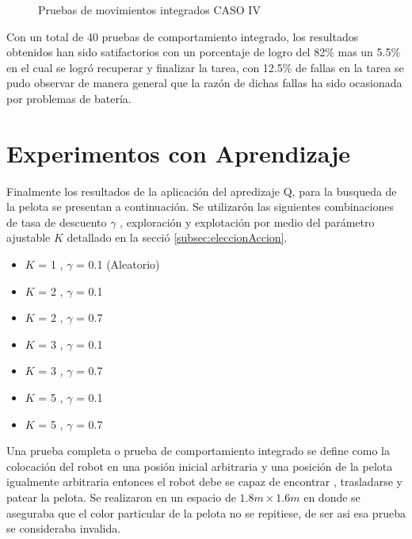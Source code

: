 \begin{figure}
\caption{Pruebas de movimientos integrados CASO IV}
\label{fig:caso4}
\end{figure} 

Con un total de 40 pruebas de comportamiento integrado, los resultados obtenidos han sido satifactorios con un porcentaje de logro del 82\% mas un 5.5\% en el cual se logró recuperar y finalizar la tarea, con 12.5\% de fallas en la tarea se pudo observar de manera general que la razón de dichas fallas ha sido ocasionada por problemas de batería.
 

\section{Experimentos con Aprendizaje}\label{sec:experimentosAprend}

Finalmente los resultados de la aplicaci\'on del apredizaje Q, para la busqueda de la pelota se presentan a continuaci\'on.
Se utilizar\'on las siguientes combinaciones de tasa de descuento $\gamma$ , exploraci\'on y explotaci\'on por medio del par\'ametro ajustable $K$ detallado en la secci\'o \ref{subsec:eleccionAccion}.

\begin{itemize}
\item $K$ = 1 , $\gamma$ = 0.1 (Aleatorio)
\item $K$ = 2 , $\gamma$ = 0.1 
\item $K$ = 2 , $\gamma$ = 0.7
\item $K$ = 3 , $\gamma$ = 0.1
\item $K$ = 3 , $\gamma$ = 0.7
\item $K$ = 5 , $\gamma$ = 0.1
\item $K$ = 5 , $\gamma$ = 0.7
   
\end{itemize}

Una prueba completa o prueba de comportamiento integrado se define como la colocaci\'on del robot en una posi\'on inicial arbitraria y una posici\'on de la pelota igualmente arbitraria entonces el robot debe se capaz de encontrar , trasladarse y patear la pelota. Se realizaron en un espacio de $1.8 m \times 1.6 m$
en donde se aseguraba que el color particular de la pelota no se repitiese, de ser asi esa prueba se consideraba invalida.

